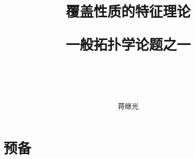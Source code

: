 \documentclass[zihao=-4,heading=true,a4paper,twoside,openany]{ctexbook}
\title{
覆盖性质的特征理论\\
	\begin{kaishu}一般拓扑学论题之一\end{kaishu}\\
}
\author{\kaishu 蒋继光}
\date{}
\theoremstyle{definition}
\theoremstyle{plain}
\begin{document}
\begin{titlepage}
	\maketitle
\end{titlepage}

\setcounter{page}{5}%
{}
\tableofcontents

\mainmatter
{}


\part{预备}\label{part1}

%
%












%






\newpage
%



\backmatter

\printbibliography[title={参考文献}]

\begin{small}
	\thispagestyle{empty}
	\onecolumn
	\printindex
\end{small}
\vfill
\eject
\end{document}
